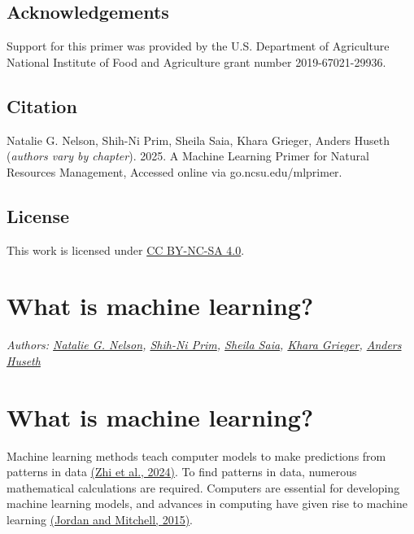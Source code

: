\documentclass[
]{book}
\begin{document}
\hypertarget{acknowledgements}{%
\section{Acknowledgements}\label{acknowledgements}}

Support for this primer was provided by the U.S. Department of Agriculture National Institute of Food and Agriculture grant number 2019-67021-29936.

\hypertarget{citation}{%
\section{Citation}\label{citation}}

Natalie G. Nelson, Shih-Ni Prim, Sheila Saia, Khara Grieger, Anders Huseth (\emph{authors vary by chapter}). 2025. A Machine Learning Primer for Natural Resources Management, Accessed online via go.ncsu.edu/mlprimer.

\hypertarget{license}{%
\section{License}\label{license}}

This work is licensed under \href{https://creativecommons.org/licenses/by-nc-sa/4.0/?ref=chooser-v1}{CC BY-NC-SA 4.0}.

\hypertarget{what-is-machine-learning}{%
\chapter{What is machine learning?}\label{what-is-machine-learning}}

\emph{Authors: \href{https://bae.ncsu.edu/people/nnelson4/}{Natalie G. Nelson}, \href{https://www.linkedin.com/in/shih-ni-prim-14033336/}{Shih-Ni Prim}, \href{https://sheilasaia.rbind.io/}{Sheila Saia}, \href{https://cals.ncsu.edu/applied-ecology/people/kdgriege/}{Khara Grieger}, \href{https://cals.ncsu.edu/entomology-and-plant-pathology/people/ashuseth/}{Anders Huseth}}

\hypertarget{what-is-machine-learning-1}{%
\chapter{What is machine learning?}\label{what-is-machine-learning-1}}

Machine learning methods teach computer models to make predictions from patterns in data \href{https://doi.org/10.1038/s44221-024-00202-z}{(Zhi et al., 2024)}. To find patterns in data, numerous mathematical calculations are required. Computers are essential for developing machine learning models, and advances in computing have given rise to machine learning \href{https://doi.org/10.1126/science.aaa8415}{(Jordan and Mitchell, 2015)}.
\end{document}
